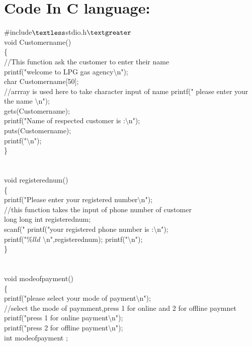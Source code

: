 \documentclass{article}
\begin{document}
\section{Code In C language:}
$\#$include$\textless$stdio.h$\textgreater$\\
void Customername()\\
\{\\
	//This function ask the customer to enter their name\\
	printf("welcome to LPG gas agency$\setminus$n");\\
	char Customername[50];\\
	//arrray is used here to take character input of name
	printf(" please enter your the name $\setminus$n");\\
	gets(Customername);\\
	printf("Name of respected customer is :$\setminus$n");\\
	puts(Customername);\\
	printf("$\setminus$n");\\
\}\\
\\
\\
 void registerednum()\\
 \{\\
    printf("Please enter your registered number$\setminus$n");\\
    //this function takes the input of phone number of customer\\
    long long int registerednum;\\
    scanf("%
    printf("your registered phone number is :$\setminus$n");\\
    printf("$\%lld$ $\setminus$n",registerednum);
    printf("$\setminus$n");\\
\}\\
\\
\\
void modeofpayment()\\
\{\\
	printf("please select your mode of payment$\setminus$n");\\
	//select the mode of paymment,press 1 for online and 2 for offline paymnet\\
	printf("press 1 for online payment$\setminus$n");\\
	printf("press 2 for offline payment$\setminus$n");\\
	int modeofpayment ;\\
\end{document}
